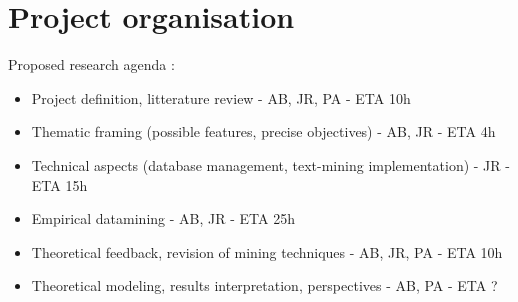 \section{Project organisation}

Proposed research agenda :

\begin{itemize}
\item Project definition, litterature review - AB, JR, PA - ETA 10h
\item Thematic framing (possible features, precise objectives) - AB, JR - ETA 4h
\item Technical aspects (database management, text-mining implementation) - JR - ETA 15h
\item Empirical datamining - AB, JR - ETA 25h
\item Theoretical feedback, revision of mining techniques - AB, JR, PA - ETA 10h
\item Theoretical modeling, results interpretation, perspectives - AB, PA - ETA ?
\end{itemize}






















